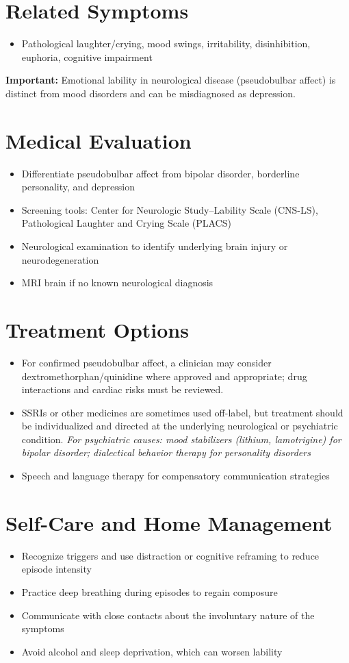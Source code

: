 \section*{Related Symptoms}
\begin{itemize}
  \item Pathological laughter/crying, mood swings, irritability, disinhibition, euphoria, cognitive impairment
\end{itemize}
\textbf{Important:} Emotional lability in neurological disease (pseudobulbar affect) is distinct from mood disorders and can be misdiagnosed as depression.

\section*{Medical Evaluation}
\begin{itemize}
  \item Differentiate pseudobulbar affect from bipolar disorder, borderline personality, and depression
  \item Screening tools: Center for Neurologic Study--Lability Scale (CNS-LS), Pathological Laughter and Crying Scale (PLACS)
  \item Neurological examination to identify underlying brain injury or neurodegeneration
  \item MRI brain if no known neurological diagnosis
\end{itemize}

\section*{Treatment Options}
\begin{itemize}
  \item For confirmed pseudobulbar affect, a clinician may consider dextromethorphan/quinidine where approved and appropriate; drug interactions and cardiac risks must be reviewed.
  \item SSRIs or other medicines are sometimes used off-label, but treatment should be individualized and directed at the underlying neurological or psychiatric condition.
  \textit{For psychiatric causes: mood stabilizers (lithium, lamotrigine) for bipolar disorder; dialectical behavior therapy for personality disorders}
  \item Speech and language therapy for compensatory communication strategies
\end{itemize}

\section*{Self-Care and Home Management}
\begin{itemize}
  \item Recognize triggers and use distraction or cognitive reframing to reduce episode intensity
  \item Practice deep breathing during episodes to regain composure
  \item Communicate with close contacts about the involuntary nature of the symptoms
  \item Avoid alcohol and sleep deprivation, which can worsen lability
\end{itemize}

